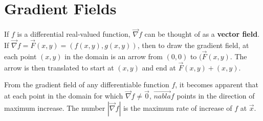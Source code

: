 \documentclass[11pt]{article}
\begin{document}
\section{Gradient Fields}
	If $f$ is a differential real-valued function, $\vec{\nabla} f$ can be thought of as a \textbf{vector field}. If $\vec{\nabla} f = \vec{F}(x, y) = (f(x, y), g(x, y))$, then to draw the gradient field, at each point $(x, y)$ in the domain is an arrow from $(0,0)$ to $(\vec{F}(x, y)$. The arrow is then translated to start at $(x, y)$ and end at $\vec{F}(x, y) + (x, y)$.
	
	From the gradient field of any differentiable function $f$, it becomes apparent that at each point in the domain for which $\vec{\nabla} f \neq \vec{0}$, $\vec{nabla} f$ points in the direction of maximum increase. The number $|\vec{\nabla} f|$ is the maximum rate of increase of $f$ at $\vec{x}$.

%		
%		


\end{document}
